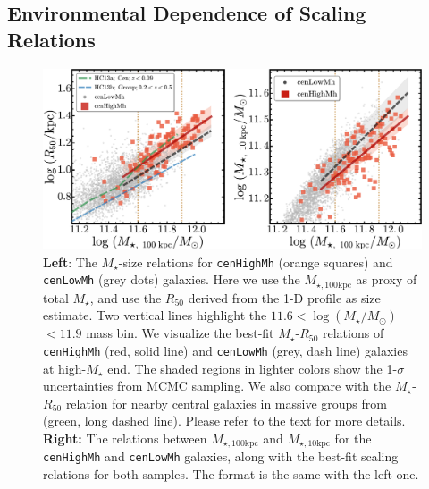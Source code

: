 \documentclass{emulateapj}
\def\rbcg{\texttt{cenHighMh}}
\def\nbcg{\texttt{cenLowMh}}
\def\mstar{{$M_{\star}$}}
\def\logms{{$\log (M_{\star}/M_{\odot})$}}
\def\minn{{$M_{\star,10\mathrm{kpc}}$}}
\def\mtot{{$M_{\star,100\mathrm{kpc}}$}}
\begin{document}
\begin{CJK*}{UTF8}{gbsn}
     
\subsection{Environmental Dependence of Scaling Relations}
    \label{ssec:scaling}

  \begin{figure}[bt!]
      \centering 
      \includegraphics[width=\textwidth]{fig/redbcg_scaling_relation}
      \caption{
          \textbf{Left}: The \mstar{}-size relations for \rbcg{} 
          (orange squares) and \nbcg{} (grey dots) galaxies. 
          Here we use the \mtot{} as proxy of total \mstar{}, and use the 
          $R_{\mathrm{50}}$ derived from the 1-D profile as size estimate. 
          Two vertical lines highlight the $11.6<$\logms{}$<11.9$ mass bin.
          We visualize the best-fit \mstar{}-$R_{\mathrm{50}}$ relations of \rbcg{} 
          (red, solid line) and \nbcg{} (grey, dash line) galaxies at high-\mstar{} end.
          The shaded regions in lighter colors show the 1-$\sigma$ uncertainties
          from MCMC sampling. 
          We also compare with the \mstar{}-$R_{\mathrm{50}}$ relation for nearby central 
          galaxies in massive groups from \citet{HCompany13} (green, long dashed line). 
          Please refer to the text for more details.~
          \textbf{Right:} The relations between \mtot{} and \minn{} for the 
          \rbcg{} and \nbcg{} galaxies, along with the best-fit scaling relations for 
          both samples.  The format is the same with the left one.
          }
      \label{fig:scaling_relation} 
  \end{figure}


\end{CJK*}
\end{document}
